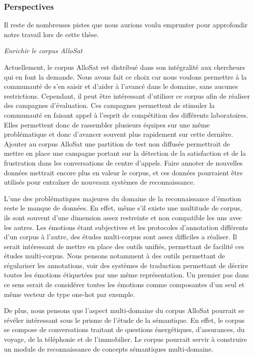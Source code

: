\subsubsection{Perspectives}
Il reste de nombreuses pistes que nous aurions voulu emprunter pour approfondir notre travail lors de cette thèse.

\vspace{1cm}

\textit{Enrichir le corpus AlloSat}

Actuellement, le corpus AlloSat est distribué dans son intégralité aux chercheurs qui en font la demande. Nous avons fait ce choix car nous voulons permettre à la communauté de s'en saisir et d'aider à l'avancé dans le domaine, sans aucunes restrictions. Cependant, il peut être intéressant d'utiliser ce corpus afin de réaliser des campagnes d'évaluation. Ces campagnes permettent de stimuler la communauté en faisant appel à l'esprit de compétition des différents laboratoires. Elles permettent donc de rassembler plusieurs équipes sur une même problématique et donc d'avancer souvent plus rapidement sur cette dernière. Ajouter au corpus AlloSat une partition de test non diffusée permettrait de mettre en place une campagne portant sur la détection de la satisfaction et de la frustration dans les conversations de centre d'appels. Faire annoter de nouvelles données mettrait encore plus en valeur le corpus, et ces données pourraient être utilisés pour entraîner de nouveaux systèmes de reconnaissance.

L'une des problématiques majeures du domaine de la reconnaissance d'émotion reste le manque de données. En effet, même s'il existe une multitude de corpus, ils sont souvent d'une dimension assez restreinte et non compatible les uns avec les autres. Les émotions étant subjectives et les protocoles d'annotation différents d'un corpus à l'autre, des études multi-corpus sont assez difficiles a réaliser. Il serait intéressant de mettre en place des outils unifiés, permettant de facilité ces études multi-corpus. Nous pensons notamment à des outils permettant de régulariser les annotations, voir des systèmes de traduction permettant de décrire toutes les émotions étiquetées par une même représentation. Un premier pas dans ce sens serait de considérer toutes les émotions comme composantes d'un seul et même vecteur de type one-hot par exemple.

De plus, nous pensons que l'aspect multi-domaine du corpus AlloSat pourrait se révéler intéressant sous le prisme de l'étude de la sémantique. En effet, le corpus se compose de conversations traitant de questions énergétiques, d'assurances, du voyage, de la téléphonie et de l'immobilier. Le corpus pourrait servir à construire un module de reconnaissance de concepts sémantiques multi-domaine.


